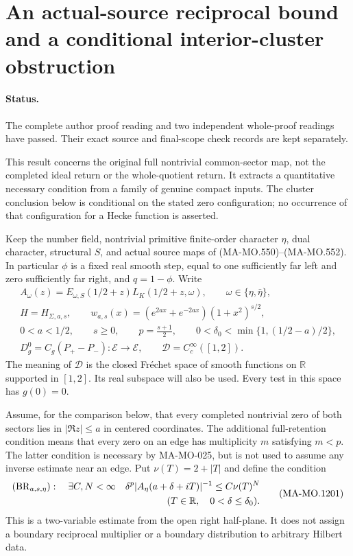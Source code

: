\section{An actual-source reciprocal bound and a conditional interior-cluster obstruction}
\label{sec:full-source-cluster-obstruction}

\paragraph{Status.}
The complete author proof reading and two independent whole-proof
readings have passed.  Their exact source and final-scope check
records are kept separately.

This result concerns the original full nontrivial common-sector
map, not the completed ideal return or the whole-quotient return.
It extracts a quantitative necessary condition from a family of
genuine compact inputs.  The cluster conclusion below is conditional
on the stated zero configuration; no occurrence of that configuration
for a Hecke function is asserted.

Keep the number field, nontrivial primitive finite-order character
$\eta$, dual character, structural $S$, and actual source maps of
(MA-MO.550)--(MA-MO.552).  In particular $\phi$ is a fixed real
smooth step, equal to one sufficiently far left and zero sufficiently
far right, and $q=1-\phi$.  Write
\[
\begin{gathered}
 A_\omega(z)=E_{\omega,S}(1/2+z)L_K(1/2+z,\omega),
       \qquad \omega\in\{\eta,\bar\eta\},\\
 H=H_{\Sigma,a,s},\qquad
 w_{a,s}(x)=(e^{2ax}+e^{-2ax})(1+x^2)^{s/2},\\
 0<a<1/2,\qquad s\ge0,\qquad
 p=\frac{s+1}{2},\qquad
 0<\delta_0<\min\{1,(1/2-a)/2\},\\
 D_g^0=C_g(P_+-P_-):\mathcal E\longrightarrow\mathcal E,
       \qquad \mathcal D=C_c^\infty([1,2]).
\end{gathered}
\tag{MA-MO.1200}
\]
The meaning of $\mathcal D$ is the closed Fr\'echet space of
smooth functions on $\mathbb R$ supported in $[1,2]$.
Its real subspace will also be used.  Every test in this space
has $g(0)=0$.

Assume, for the comparison below, that every completed nontrivial
zero of both sectors lies in $|\Re z|\le a$ in centered coordinates.
The additional full-retention condition means that every zero on
an edge has multiplicity $m$ satisfying $m<p$.  The latter condition
is necessary by MA-MO-025, but is not used to assume any inverse
estimate near an edge.  Put $\nu(T)=2+|T|$ and define the condition
\[
 \begin{gathered}
 (\mathrm{BR}_{a,s,\eta}):\quad
 \exists C,N<\infty\quad
 \delta^p|A_\eta(a+\delta+iT)|^{-1}
       \le C\nu(T)^N\\
 \hfill(T\in\mathbb R,\quad0<\delta\le\delta_0).
 \end{gathered}
 \tag{MA-MO.1201}
\]
This is a two-variable estimate from the open right half-plane.
It does not assign a boundary reciprocal multiplier or a boundary
distribution to arbitrary Hilbert data.

